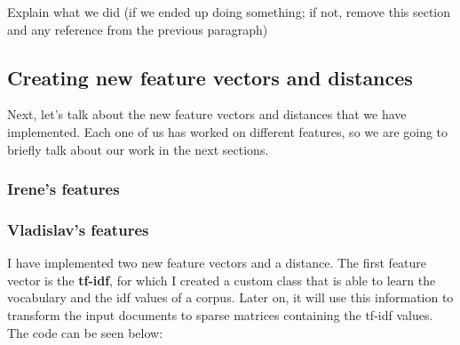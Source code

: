\documentclass[11pt,a4paper]{article}
\begin{document}
Explain what we did (if we ended up doing something; if not, remove this section
and any reference from the previous paragraph)

\subsection{Creating new feature vectors and distances}

Next, let's talk about the new feature vectors and distances that we have implemented.
Each one of us has worked on different features, so we are going to briefly talk about
our work in the next sections.

\subsubsection{Irene's features}

\subsubsection{Vladislav's features}

I have implemented two new feature vectors and a distance. The first feature vector
is the \textbf{tf-idf}, for which I created a custom class that is able to learn the
vocabulary and the idf values of a corpus. Later on, it will use this
information to transform the input documents to sparse matrices containing the
tf-idf values. The code can be seen below:
\end{document}

